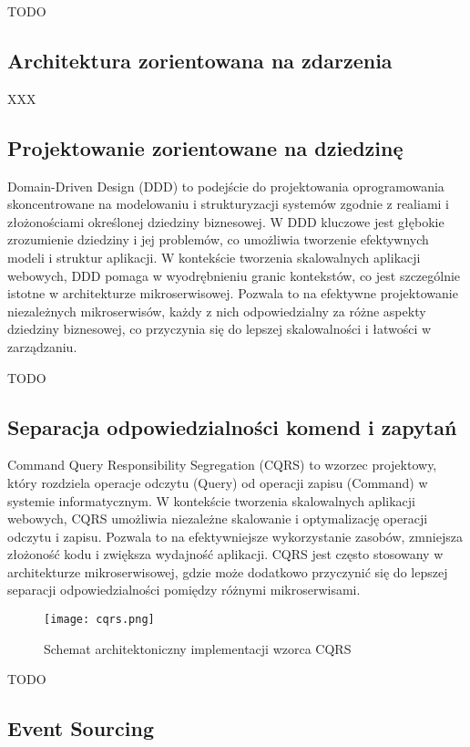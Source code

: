 TODO

\subsection{Architektura zorientowana na zdarzenia}

XXX

\subsection{Projektowanie zorientowane na dziedzinę}

Domain-Driven Design (DDD) to podejście do projektowania oprogramowania skoncentrowane na modelowaniu i strukturyzacji systemów zgodnie z realiami i złożonościami określonej dziedziny biznesowej. W DDD kluczowe jest głębokie zrozumienie dziedziny i jej problemów, co umożliwia tworzenie efektywnych modeli i struktur aplikacji. W kontekście tworzenia skalowalnych aplikacji webowych, DDD pomaga w wyodrębnieniu granic kontekstów, co jest szczególnie istotne w architekturze mikroserwisowej. Pozwala to na efektywne projektowanie niezależnych mikroserwisów, każdy z nich odpowiedzialny za różne aspekty dziedziny biznesowej, co przyczynia się do lepszej skalowalności i łatwości w zarządzaniu.

TODO

\subsection{Separacja odpowiedzialności komend i zapytań}

Command Query Responsibility Segregation (CQRS) to wzorzec projektowy, który rozdziela operacje odczytu (Query) od operacji zapisu (Command) w systemie informatycznym. W kontekście tworzenia skalowalnych aplikacji webowych, CQRS umożliwia niezależne skalowanie i optymalizację operacji odczytu i zapisu. Pozwala to na efektywniejsze wykorzystanie zasobów, zmniejsza złożoność kodu i zwiększa wydajność aplikacji. CQRS jest często stosowany w architekturze mikroserwisowej, gdzie może dodatkowo przyczynić się do lepszej separacji odpowiedzialności pomiędzy różnymi mikroserwisami.

\begin{figure}[!h]
    \centering \texttt{[image: cqrs.png]}
    \caption{Schemat architektoniczny implementacji wzorca CQRS}
\end{figure}

TODO

\subsection{Event Sourcing}

